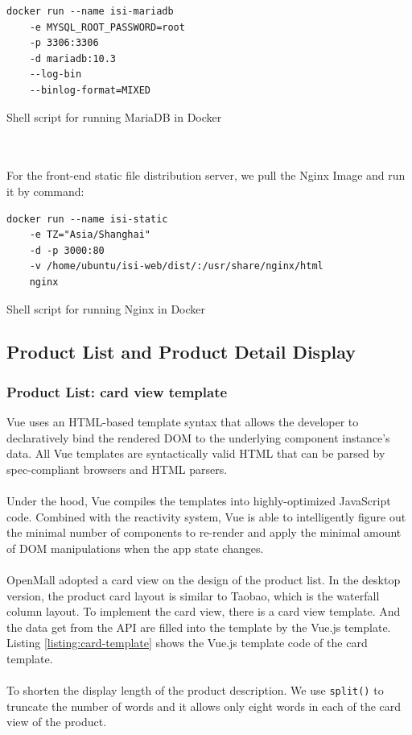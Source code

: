 \documentclass{article}
\begin{document}
\begin{listing}[!htp]
\begin{verbatim}
docker run --name isi-mariadb
    -e MYSQL_ROOT_PASSWORD=root
    -p 3306:3306
    -d mariadb:10.3
    --log-bin
    --binlog-format=MIXED
\end{verbatim}
\caption{Shell script for running MariaDB in Docker}
\end{listing}

\leavevmode
\\\\
For the front-end static file distribution server, we pull the Nginx Image and run it by command:

\begin{listing}[!htp]
\begin{verbatim}
docker run --name isi-static
    -e TZ="Asia/Shanghai"
    -d -p 3000:80
    -v /home/ubuntu/isi-web/dist/:/usr/share/nginx/html
    nginx
\end{verbatim}
\caption{Shell script for running Nginx in Docker}
\end{listing}

\subsection{Product List and Product Detail Display}

\subsubsection{Product List: card view template}
Vue uses an HTML-based template syntax that allows the developer to declaratively bind the rendered DOM to the underlying component instance's data. All Vue templates are syntactically valid HTML that can be parsed by spec-compliant browsers and HTML parsers.
\\\\
Under the hood, Vue compiles the templates into highly-optimized JavaScript code. Combined with the reactivity system, Vue is able to intelligently figure out the minimal number of components to re-render and apply the minimal amount of DOM manipulations when the app state changes. \cite{template}
\\\\
OpenMall adopted a card view on the design of the product list. In the desktop version, the product card layout is similar to Taobao, which is the waterfall column layout. To implement the card view, there is a card view template. And the data get from the API are filled into the template by the Vue.js template. Listing \ref{listing:card-template} shows the Vue.js template code of the card template.
\\\\
To shorten the display length of the product description. We use \verb|split()| to truncate the number of words and it allows only eight words in each of the card view of the product.
\end{document}
